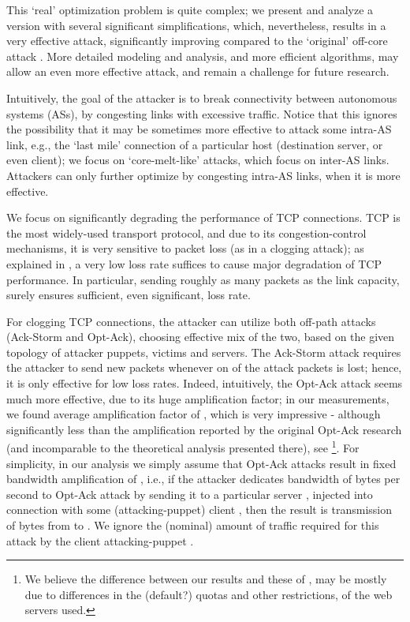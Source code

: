 \documentclass[conference]{IEEEtran}
\begin{document}
This `real' optimization problem is quite complex; we present and analyze a version with several significant simplifications, which, nevertheless, results in a very effective attack, significantly improving compared to the `original' off-core attack \cite{conf/esorics/StuderP09}. More detailed modeling and analysis, and more efficient algorithms, may allow an even more effective attack, and remain a challenge for future research.


Intuitively, the goal of the attacker is to break connectivity between autonomous systems (ASs), by congesting links with excessive traffic. Notice that this ignores the possibility that it may be sometimes more effective to attack some intra-AS link, e.g., the `last mile' connection of a particular host (destination server, or even client); we focus on `core-melt-like' attacks, which focus on inter-AS links. Attackers can only further optimize by congesting intra-AS links, when it is more effective. 

We focus on significantly degrading the performance of TCP connections. TCP is the most widely-used transport protocol, and due to its congestion-control mechanisms, it is very sensitive to packet loss (as in a clogging attack); as explained in \cite{AH11:Ack}, a very low loss rate suffices to cause major degradation of TCP performance. In particular, sending roughly as many packets as the link capacity, surely ensures sufficient, even significant, loss rate. 

For clogging TCP connections, the attacker can utilize both off-path attacks (Ack-Storm and Opt-Ack), choosing effective mix of the two, based on the given topology of attacker puppets, victims and servers. The Ack-Storm attack requires the attacker to send new packets whenever on of the attack packets is lost; hence, it is only effective for low loss rates. Indeed, intuitively, the Opt-Ack attack seems much more effective, due to its huge amplification factor; in our measurements, we found average amplification factor of , which is very impressive - although significantly less than the amplification reported by the original Opt-Ack research (and incomparable to the theoretical analysis presented there), see \cite{SBB05:OptAck}\footnote{We believe the difference between our results  and these of \cite{SBB05:OptAck}, may be mostly due to differences in the (default?) quotas and other restrictions, of the web servers used.}. For simplicity, in our analysis we simply assume that Opt-Ack attacks result in fixed bandwidth amplification of , i.e., if the attacker dedicates bandwidth of  bytes per second to Opt-Ack attack by sending it to a particular server , injected into connection with some (attacking-puppet) client , then the result is transmission of  bytes from  to . We ignore the (nominal) amount of traffic required for this attack by the client attacking-puppet . 
\end{document}
